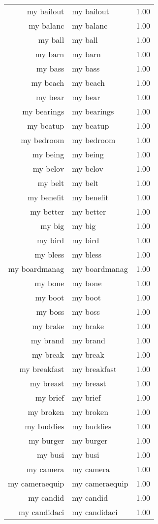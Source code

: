 \begin{table}[ht]
\begin{tabular}{rlr}
  my bailout & my bailout & 1.00 \\ 
  my balanc & my balanc & 1.00 \\ 
  my ball & my ball & 1.00 \\ 
  my barn & my barn & 1.00 \\ 
  my bass & my bass & 1.00 \\ 
  my beach & my beach & 1.00 \\ 
  my bear & my bear & 1.00 \\ 
  my bearings & my bearings & 1.00 \\ 
  my beatup & my beatup & 1.00 \\ 
  my bedroom & my bedroom & 1.00 \\ 
  my being & my being & 1.00 \\ 
  my belov & my belov & 1.00 \\ 
  my belt & my belt & 1.00 \\ 
  my benefit & my benefit & 1.00 \\ 
  my better & my better & 1.00 \\ 
  my big & my big & 1.00 \\ 
  my bird & my bird & 1.00 \\ 
  my bless & my bless & 1.00 \\ 
  my boardmanag & my boardmanag & 1.00 \\ 
  my bone & my bone & 1.00 \\ 
  my boot & my boot & 1.00 \\ 
  my boss & my boss & 1.00 \\ 
  my brake & my brake & 1.00 \\ 
  my brand & my brand & 1.00 \\ 
  my break & my break & 1.00 \\ 
  my breakfast & my breakfast & 1.00 \\ 
  my breast & my breast & 1.00 \\ 
  my brief & my brief & 1.00 \\ 
  my broken & my broken & 1.00 \\ 
  my buddies & my buddies & 1.00 \\ 
  my burger & my burger & 1.00 \\ 
  my busi & my busi & 1.00 \\ 
  my camera & my camera & 1.00 \\ 
  my cameraequip & my cameraequip & 1.00 \\ 
  my candid & my candid & 1.00 \\ 
  my candidaci & my candidaci & 1.00 \\ 

\end{tabular}
\end{table}
